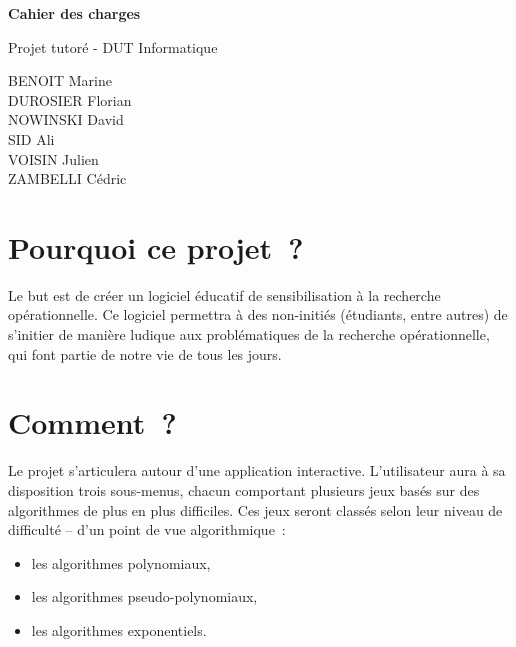\documentclass[12pt]{report}
\begin{document}
  \vspace*{\fill}
  \begin{center}
    {\bf \Large Cahier des charges}
  
    \vspace{3em}
  
    {\large Projet tutoré - DUT Informatique}
  
    \vspace{5em}
  
    BENOIT Marine \\
    DUROSIER Florian \\
    NOWINSKI David \\
    SID Ali \\
    VOISIN Julien \\
    ZAMBELLI Cédric
  \end{center}
  \vspace*{\fill}
  \newpage
  
  \tableofcontents
  
  \newpage
  
  \section{Pourquoi ce projet~?}
  
  Le but est de créer un logiciel éducatif de sensibilisation à
   la recherche opérationnelle. Ce logiciel permettra à des non-initiés
   (étudiants, entre autres) de s'initier de manière ludique aux
   problématiques de la recherche opérationnelle, qui font partie
   de notre vie de tous les jours.
 
 \section{Comment~?}
 
 Le projet s'articulera autour d'une application interactive.
  L'utilisateur aura à sa disposition trois sous-menus, chacun comportant
  plusieurs jeux basés sur des algorithmes de plus en plus difficiles.
  Ces jeux seront classés selon leur niveau de difficulté -- d'un point de
  vue algorithmique~:
 
 \begin{itemize}
   \item les algorithmes polynomiaux,
   \item les algorithmes pseudo-polynomiaux,
   \item les algorithmes exponentiels.
   \end{itemize}
 
\end{document}
